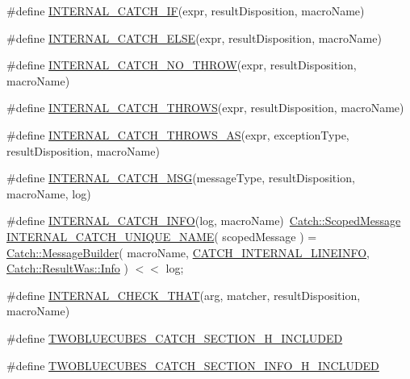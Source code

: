 \begin{DoxyCompactItemize}
\item 
\#define \hyperlink{a00094_a0464f43bb9cdca1e645640677f26cb13}{I\+N\+T\+E\+R\+N\+A\+L\+\_\+\+C\+A\+T\+C\+H\+\_\+\+I\+F}(expr,  result\+Disposition,  macro\+Name)
\item 
\#define \hyperlink{a00094_a82505ae0c9e3c7f5bf9c2a07d6503a45}{I\+N\+T\+E\+R\+N\+A\+L\+\_\+\+C\+A\+T\+C\+H\+\_\+\+E\+L\+S\+E}(expr,  result\+Disposition,  macro\+Name)
\item 
\#define \hyperlink{a00094_aaa38ad6989965be6130366ea0892f1da}{I\+N\+T\+E\+R\+N\+A\+L\+\_\+\+C\+A\+T\+C\+H\+\_\+\+N\+O\+\_\+\+T\+H\+R\+O\+W}(expr,  result\+Disposition,  macro\+Name)
\item 
\#define \hyperlink{a00094_a60549afdb2a4590fc8da21c56c11ba5b}{I\+N\+T\+E\+R\+N\+A\+L\+\_\+\+C\+A\+T\+C\+H\+\_\+\+T\+H\+R\+O\+W\+S}(expr,  result\+Disposition,  macro\+Name)
\item 
\#define \hyperlink{a00094_a2f6f8a62aaedd398df98f11b6ab3d8eb}{I\+N\+T\+E\+R\+N\+A\+L\+\_\+\+C\+A\+T\+C\+H\+\_\+\+T\+H\+R\+O\+W\+S\+\_\+\+A\+S}(expr,  exception\+Type,  result\+Disposition,  macro\+Name)
\item 
\#define \hyperlink{a00094_aee1ba712b8d150dd3ad51899e24d52e8}{I\+N\+T\+E\+R\+N\+A\+L\+\_\+\+C\+A\+T\+C\+H\+\_\+\+M\+S\+G}(message\+Type,  result\+Disposition,  macro\+Name,  log)
\item 
\#define \hyperlink{a00094_a08b133553db6141c660d7cb89229a4ad}{I\+N\+T\+E\+R\+N\+A\+L\+\_\+\+C\+A\+T\+C\+H\+\_\+\+I\+N\+F\+O}(log,  macro\+Name)~\hyperlink{a00071}{Catch\+::\+Scoped\+Message} \hyperlink{a00094_afe320ceec108fc8c160f9ac3938f1bc8}{I\+N\+T\+E\+R\+N\+A\+L\+\_\+\+C\+A\+T\+C\+H\+\_\+\+U\+N\+I\+Q\+U\+E\+\_\+\+N\+A\+M\+E}( scoped\+Message ) = \hyperlink{a00049}{Catch\+::\+Message\+Builder}( macro\+Name, \hyperlink{a00094_abc0b2405454c51748a31e0393d9ad5d1}{C\+A\+T\+C\+H\+\_\+\+I\+N\+T\+E\+R\+N\+A\+L\+\_\+\+L\+I\+N\+E\+I\+N\+F\+O}, \hyperlink{a00069_a624e1ee3661fcf6094ceef1f654601efa30222063929ca1b6318faa78e8242f1c}{Catch\+::\+Result\+Was\+::\+Info} ) $<$$<$ log;
\item 
\#define \hyperlink{a00094_a243c8e2802ce58df247f51bcb8a15650}{I\+N\+T\+E\+R\+N\+A\+L\+\_\+\+C\+H\+E\+C\+K\+\_\+\+T\+H\+A\+T}(arg,  matcher,  result\+Disposition,  macro\+Name)
\item 
\#define \hyperlink{a00094_a8d1f899b4d3552159fecfb94489a987c}{T\+W\+O\+B\+L\+U\+E\+C\+U\+B\+E\+S\+\_\+\+C\+A\+T\+C\+H\+\_\+\+S\+E\+C\+T\+I\+O\+N\+\_\+\+H\+\_\+\+I\+N\+C\+L\+U\+D\+E\+D}
\item 
\#define \hyperlink{a00094_a81c64c1b655f2696bb14eca5538fac46}{T\+W\+O\+B\+L\+U\+E\+C\+U\+B\+E\+S\+\_\+\+C\+A\+T\+C\+H\+\_\+\+S\+E\+C\+T\+I\+O\+N\+\_\+\+I\+N\+F\+O\+\_\+\+H\+\_\+\+I\+N\+C\+L\+U\+D\+E\+D}
$$
\end{DoxyCompactItemize}
